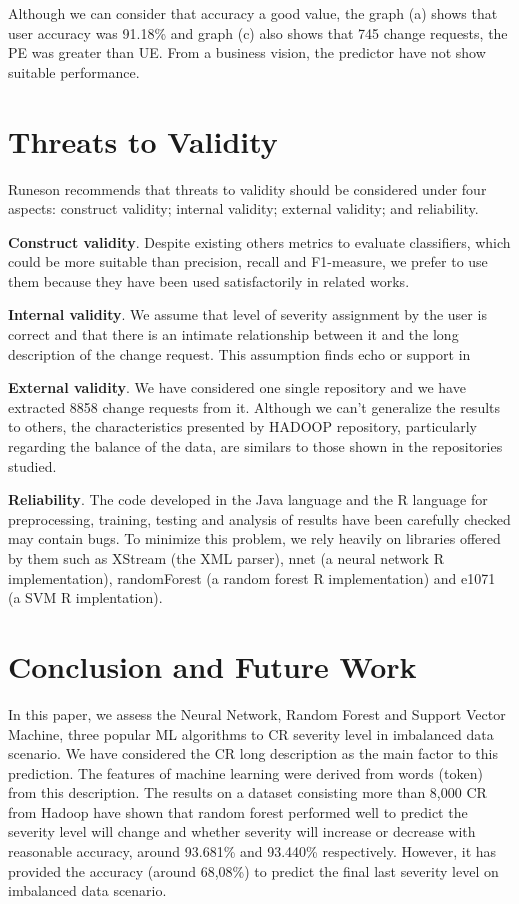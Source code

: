 \documentclass[10pt, conference]{IEEEtran}
\begin{document}
Although we can consider that accuracy a good value, the graph (a) shows that user accuracy was 91.18\% and graph (c) also shows that 745 change requests, the PE was greater than UE. From a business vision, the predictor have not show suitable performance.

\section{Threats to Validity}   \label{threats}
Runeson \cite{Runeson2009} recommends that threats to validity should be considered under four aspects: construct validity;  internal validity; external validity; and reliability.

\textbf{Construct validity}. Despite existing others metrics to evaluate classifiers\cite{Facelli2015}, which could be more suitable than precision, recall and F1-measure, we prefer to use them because they have been used satisfactorily in related works\cite{Menzies2008, Lamkanfi2010, Lamkanfi2011, ValdiviaGarcia2014}.


\textbf{Internal validity}. We assume that level of severity assignment by the user is correct and that there is an intimate relationship between it and the long description of the change request. This assumption finds echo or support in \cite{Lamkanfi2010, Tian2012}

\textbf{External validity}. We have considered one single repository and we have extracted 8858 change requests from it. Although we can't generalize the results to others, the characteristics presented by HADOOP repository, particularly regarding the balance of the data, are similars to those shown in the repositories studied\cite{Lamkanfi2010, Lamkanfi2011, Tian2012,ValdiviaGarcia2014}.

\textbf{Reliability}. The code developed in the Java language and the R language for preprocessing, training, testing and analysis of results have been carefully checked may contain bugs. To minimize this problem, we rely heavily on libraries offered by them such as XStream (the XML parser), nnet (a neural network R implementation), randomForest (a random forest R implementation) and e1071 (a SVM R implentation). 

\section{Conclusion and Future Work} \label{sec:conclusion}
In this paper, we assess the Neural Network, Random Forest and Support Vector Machine, three popular ML algorithms to CR severity level in imbalanced data scenario. We have considered the CR long description as the main factor to
this prediction. The features of machine learning were derived from
words (token) from this description. The results on a dataset consisting more than
8,000 CR from Hadoop have shown that random forest performed well to predict the severity level will change and whether severity will increase or decrease with reasonable accuracy, around 93.681\% and 93.440\% respectively. However, it has provided the accuracy (around 68,08\%) to predict the final last severity level on imbalanced data scenario.
\end{document}
